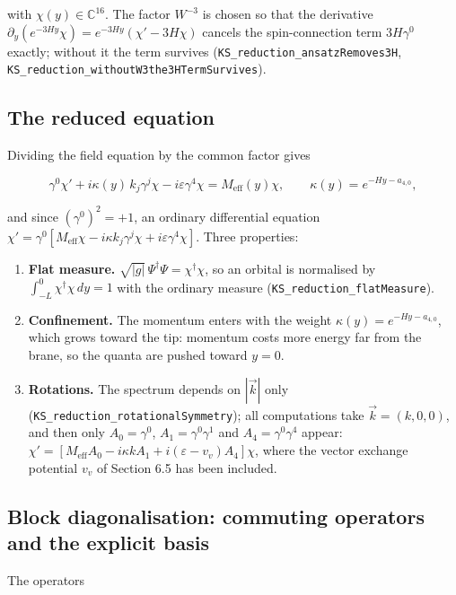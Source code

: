 \documentclass[11pt]{article}
\begin{document}
with $\chi(y)\in\mathbb C^{16}$. The factor $W^{-3}$ is chosen so that the derivative $\partial_y(e^{-3Hy}\chi)=e^{-3Hy}(\chi'-3H\chi)$ cancels the spin-connection term $3H\gamma^0$ exactly; without it the term survives (\texttt{KS\_reduc\allowbreak{}tion\_ans\allowbreak{}atzRemov\allowbreak{}es3H}, \texttt{KS\_reduc\allowbreak{}tion\_wit\allowbreak{}houtW3th\allowbreak{}e3HTermS\allowbreak{}urvives}).

\subsection{The reduced equation}

Dividing the field equation by the common factor gives

\[
\gamma^0\chi'+i\kappa(y)\,k_j\gamma^j\chi-i\varepsilon\gamma^4\chi=M_{\mathrm{eff}}(y)\chi,\qquad \kappa(y)=e^{-Hy-a_{4,0}},
\]

and since $(\gamma^0)^2=+1$, an ordinary differential equation $\chi'=\gamma^0[M_{\mathrm{eff}}\chi-i\kappa k_j\gamma^j\chi+i\varepsilon\gamma^4\chi]$. Three properties:

\begin{enumerate}
\item \textbf{Flat measure.} $\sqrt{|g|}\,\Psi^\dagger\Psi=\chi^\dagger\chi$, so an orbital is normalised by $\int_{-L}^0\chi^\dagger\chi\,dy=1$ with the ordinary measure (\texttt{KS\_reduc\allowbreak{}tion\_fla\allowbreak{}tMeasure}).
\item \textbf{Confinement.} The momentum enters with the weight $\kappa(y)=e^{-Hy-a_{4,0}}$, which grows toward the tip: momentum costs more energy far from the brane, so the quanta are pushed toward $y=0$.
\item \textbf{Rotations.} The spectrum depends on $|\vec k|$ only (\texttt{KS\_reduc\allowbreak{}tion\_rot\allowbreak{}ationalS\allowbreak{}ymmetry}); all computations take $\vec k=(k,0,0)$, and then only $A_0=\gamma^0$, $A_1=\gamma^0\gamma^1$ and $A_4=\gamma^0\gamma^4$ appear: $\chi'=[M_{\mathrm{eff}}A_0-i\kappa kA_1+i(\varepsilon-v_v)A_4]\chi$, where the vector exchange potential $v_v$ of Section 6.5 has been included.
\end{enumerate}

\subsection{Block diagonalisation: commuting operators and the explicit basis}

The operators
\end{document}
